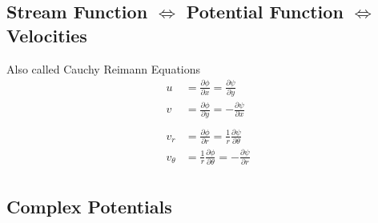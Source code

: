 \documentclass[11pt, letterpaper, notitlepage, landscape]{article}
\begin{document}
\subsection{Stream Function $\Leftrightarrow$ Potential Function $\Leftrightarrow$ Velocities}
Also called Cauchy Reimann Equations
\begin{align*}
u &= \frac{\partial \phi}{\partial x} = \frac{\partial \psi}{\partial y} \\
v &= \frac{\partial \phi}{\partial y} = -\frac{\partial \psi}{\partial x} \\ \\
v_r &= \frac{\partial \phi}{\partial r} = \frac{1}{r} \frac{\partial \psi}{\partial \theta} \\
v_{\theta} &= \frac{1}{r} \frac{\partial \phi}{\partial \theta} = -\frac{\partial \psi}{\partial r} \\
\end{align*}

\subsection{Complex Potentials}
\end{document}
